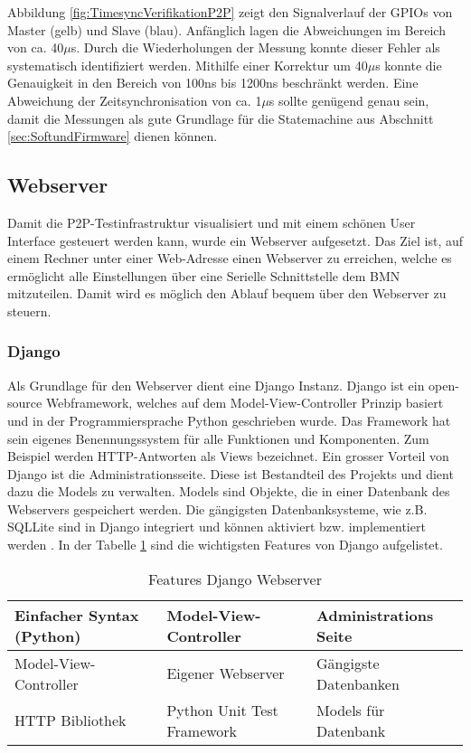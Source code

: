 Abbildung \ref{fig:TimesyncVerifikationP2P} zeigt den Signalverlauf der GPIOs von Master (gelb) und Slave (blau).
Anfänglich lagen die Abweichungen im Bereich von ca. 40$\mu$s.
Durch die Wiederholungen der Messung konnte dieser Fehler als systematisch identifiziert werden.
Mithilfe einer Korrektur um 40$\mu$s konnte die Genauigkeit in den Bereich von 100ns bis 1200ns beschränkt werden. Eine Abweichung der Zeitsynchronisation von ca. 1$\mu$s sollte genügend genau sein, damit die Messungen als gute Grundlage für die Statemachine aus Abschnitt \ref{sec:SoftundFirmware} dienen können. 
 
\subsection{Webserver}\label{subsec:DjangoWebserver}
Damit die P2P-Testinfrastruktur visualisiert und mit einem schönen User Interface gesteuert werden kann, wurde ein Webserver aufgesetzt.
Das Ziel ist, auf einem Rechner unter einer Web-Adresse einen Webserver zu erreichen, welche es ermöglicht alle Einstellungen über eine Serielle Schnittstelle dem BMN mitzuteilen.
Damit wird es möglich den Ablauf bequem über den Webserver zu steuern.

\subsubsection{Django}\label{subsubsec:Django}
Als Grundlage für den Webserver dient eine Django Instanz.
Django ist ein open-source Webframework, welches auf dem Model-View-Controller Prinzip basiert und in der Programmiersprache Python geschrieben wurde.
Das Framework hat sein eigenes Benennungssystem für alle Funktionen und Komponenten.
Zum Beispiel werden HTTP-Antworten als Views bezeichnet.
Ein grosser Vorteil von Django ist die Administrationsseite.
Diese ist Bestandteil des Projekts und dient dazu die Models zu verwalten.
Models sind Objekte, die in einer Datenbank des Webservers gespeichert werden. Die gängigsten Datenbanksysteme, wie z.B. SQLLite sind in Django integriert und können aktiviert bzw. implementiert werden \cite{django_django_2020}.
In der Tabelle \ref{table:FeaturesDjango} sind die wichtigsten Features von Django aufgelistet.


\begin{table}[h]
\centering
\begin{tabular}{|l|l|l|} 
\hline
Einfacher Syntax (Python) & Model-View-Controller & Administrations Seite \\ 
\hline
Model-View-Controller & Eigener Webserver & Gängigste Datenbanken \\ 
\hline
HTTP Bibliothek & Python Unit Test Framework & Models für Datenbank \\
\hline
\end{tabular}
\caption{Features Django Webserver \cite{django_django_2020}}
\label{table:FeaturesDjango}
\end{table}

